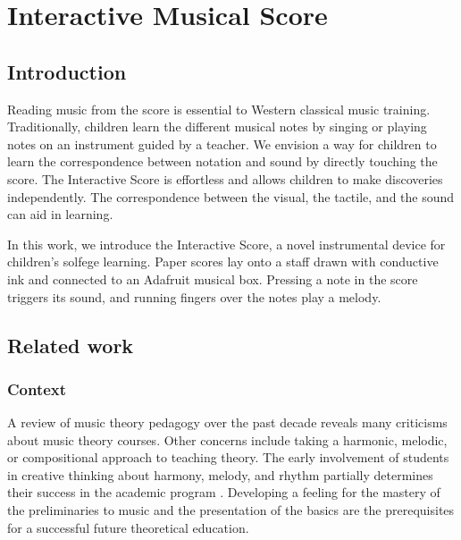 \chapter{Interactive Musical Score}

\section{Introduction}

Reading music from the score is essential to Western classical music training. Traditionally, children learn the different musical notes by singing or playing notes on an instrument guided by a teacher. We envision a way for children to learn the correspondence between notation and sound by directly touching the score.
The Interactive Score is effortless and allows children to make discoveries independently. The correspondence between the visual, the tactile, and the sound can aid in learning.

In this work, we introduce the Interactive Score, a novel instrumental device for children's solfege learning. Paper scores lay onto a staff drawn with conductive ink and connected to an Adafruit musical box. Pressing a note in the score triggers its sound, and running fingers over the notes play a melody.


\section{Related work}

\subsection{Context}

A review of music theory pedagogy over the past decade reveals many criticisms about music theory courses. Other concerns include taking a harmonic, melodic, or compositional approach to teaching theory. The early involvement of students in creative thinking about harmony, melody, and rhythm partially determines their success in the academic program \cite{bland1977college}. Developing a feeling for the mastery of the preliminaries to music and the presentation of the basics are the prerequisites for a successful future theoretical education.

